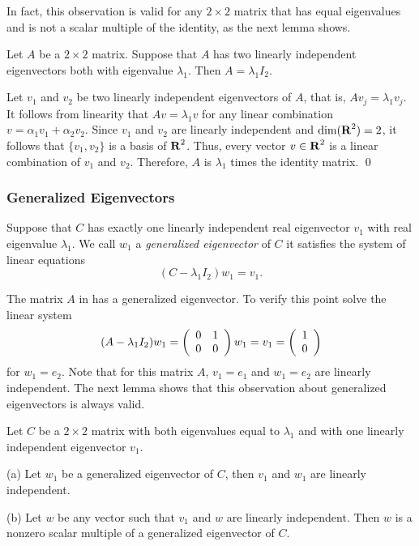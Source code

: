In fact, this observation is valid for any $2\times 2$ matrix that has
equal eigenvalues and is not a scalar multiple of the identity, as the next
lemma shows.

\begin{lemma}  \label{L:1indeig}
Let $A$ be a $2\times 2$ matrix.  Suppose that $A$ has two linearly
independent eigenvectors both with eigenvalue $\lambda_1$.
Then $A=\lambda_1 I_2$.
\end{lemma}

\proof  Let $v_1$ and $v_2$ be two linearly independent
eigenvectors of $A$, that is, $Av_j = \lambda_1 v_j$.  It follows
from linearity that $Av=\lambda_1 v$ for any linear combination
$v=\alpha_1v_1+\alpha_2v_2$.  Since $v_1$ and $v_2$ are linearly
independent and $\dim(\mbox{$\bf{R}$}^2)=2$, it follows that $\{v_1,v_2\}$ is
a basis of $\mbox{$\bf{R}$}^2$.  Thus, every vector $v\in\mbox{$\bf{R}$}^2$ is a linear
combination of $v_1$ and $v_2$.  Therefore, $A$ is $\lambda_1$ times
the identity matrix.  \qed

\subsubsection*{Generalized Eigenvectors}

Suppose that $C$ has exactly one linearly independent real eigenvector $v_1$
with real eigenvalue $\lambda_1$.  We call $w_1$ a {\em generalized
eigenvector\/} of $C$ it satisfies the
system of linear equations
\begin{equation} \label{e:Cw=lw+va}
(C-\lambda_1I_2)w_1 = v_1.
\end{equation}

The matrix $A$ in  has a generalized eigenvector. To verify
this point solve the linear system
\[
(A-\lambda_1I_2)w_1 = \left(\begin{array}{rr} 0 & 1\\ 0 &0\end{array}\right)w_1 = v_1 = \left(\begin{array}{r} 1 \\ 0\end{array}\right)
\]
for $w_1=e_2$.   Note that for this matrix $A$, $v_1=e_1$ and $w_1=e_2$ are
linearly independent.  The next lemma shows that this observation about
generalized eigenvectors is always valid.

\begin{lemma}  \label{L:geneig2}
Let $C$ be a $2\times 2$ matrix with both eigenvalues equal to $\lambda_1$
and with one linearly independent eigenvector $v_1$.  

\noindent (a)  Let $w_1$ be a generalized eigenvector of $C$, then $v_1$ and 
$w_1$ are linearly independent. 

\noindent (b)  Let $w$ be any vector such that $v_1$ and $w$ are linearly 
independent.  Then $w$ is a nonzero scalar multiple of a generalized 
eigenvector of $C$.
\end{lemma}

